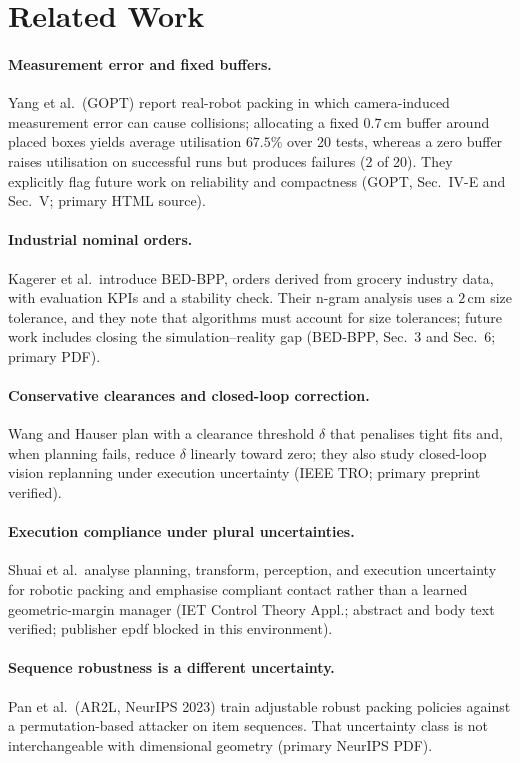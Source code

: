 \section{Related Work}

\paragraph{Measurement error and fixed buffers.}
Yang et al.\ (GOPT) report real-robot packing in which camera-induced
measurement error can cause collisions; allocating a fixed $0.7\,\mathrm{cm}$
buffer around placed boxes yields average utilisation $67.5\%$ over 20 tests,
whereas a zero buffer raises utilisation on successful runs but produces
failures (2 of 20). They explicitly flag future work on reliability and
compactness (GOPT, Sec.~IV-E and Sec.~V; primary HTML source).

\paragraph{Industrial nominal orders.}
Kagerer et al.\ introduce BED-BPP, orders derived from grocery industry data,
with evaluation KPIs and a stability check. Their n-gram analysis uses a
$2\,\mathrm{cm}$ size tolerance, and they note that algorithms must account for
size tolerances; future work includes closing the simulation--reality gap
(BED-BPP, Sec.~3 and Sec.~6; primary PDF).

\paragraph{Conservative clearances and closed-loop correction.}
Wang and Hauser plan with a clearance threshold $\delta$ that penalises tight
fits and, when planning fails, reduce $\delta$ linearly toward zero; they also
study closed-loop vision replanning under execution uncertainty (IEEE TRO;
primary preprint verified).

\paragraph{Execution compliance under plural uncertainties.}
Shuai et al.\ analyse planning, transform, perception, and execution
uncertainty for robotic packing and emphasise compliant contact rather than a
learned geometric-margin manager (IET Control Theory Appl.; abstract and body
text verified; publisher epdf blocked in this environment).

\paragraph{Sequence robustness is a different uncertainty.}
Pan et al.\ (AR2L, NeurIPS 2023) train adjustable robust packing policies
against a permutation-based attacker on item sequences. That uncertainty class
is not interchangeable with dimensional geometry (primary NeurIPS PDF).

